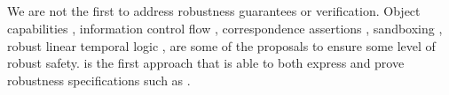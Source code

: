  \subsection{} %
 
 We are not the first  to address robustness guarantees or verification.
Object capabilities  \cite{MillerPhD, dd, threoremsFreeSep}, 
information control flow \cite{Zdancewic:Myers:01,noninteferenceOS}, 
 correspondence assertions \cite{Maffeis:aiamb:thesis00},
 sandboxing  \cite{robustSafetyPatrignani,sandbox},
robust linear temporal logic   \cite{RLTL2022}, are some of the proposals to ensure some level of robust safety. 
%
\Nec is the first approach that is able to  both express and prove
robustness specifications such as  \SrobustB.



